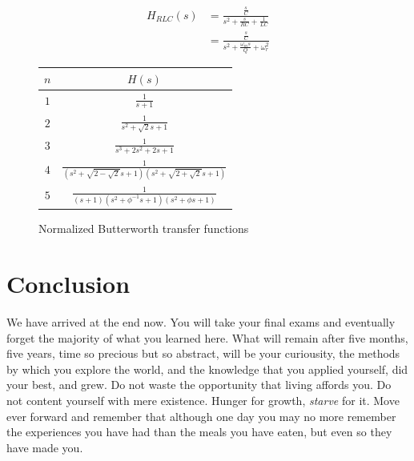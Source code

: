 \documentclass[nobib]{tufte-handout}
\begin{document}
\begin{align}
    H_{RLC}(s) &= \frac{\frac{s}{C}}{s^2 + \frac{s}{RC} + \frac{1}{LC}} \\
    &= \frac{\frac{s}{C}}{s^2 + \frac{\omega_m s}{Q} + \omega^2_r}
\end{align}

\begin{figure}
    \begin{center}
        \begin{tabular}{c | c}
            $n$ & $H(s)$ \\
            \hline
            $1$ & $\frac{1}{s+1}$ \\
            $2$ & $\frac{1}{s^2+\sqrt{2}s + 1}$ \\
            $3$ & $\frac{1}{s^3 + 2s^2 + 2s + 1}$ \\
            $4$ & $\frac{1}{(s^{2}+\sqrt{2-\sqrt{2} } s+1)(s^{2}+\sqrt{2+\sqrt{2} } s+1)}$ \\
            $5$ & $\frac{1}{(s+1)(s^2+\phi^{-1} s+1)(s^2+\phi s+1)}$
        \end{tabular}
    \end{center}
    \caption{Normalized Butterworth transfer functions}
    \label{tab:normalized butterworth}
\end{figure}

\newpage

\section{Conclusion}

We have arrived at the end now. 
You will take your final exams 
and eventually forget the 
majority of what you learned
here. What will remain after 
five months, five years, time 
so precious but so abstract, 
will be your curiousity, the 
methods by which you explore the 
world, and the knowledge that 
you applied yourself, did your 
best, and grew. Do not waste 
the opportunity that living 
affords you. Do not content 
yourself with mere existence. 
Hunger for growth, \emph{starve}
for it. Move ever forward
and remember that although 
one day you may no more 
remember the experiences you 
have had than the meals you have 
eaten, but even so they have 
made you.
\end{document}
